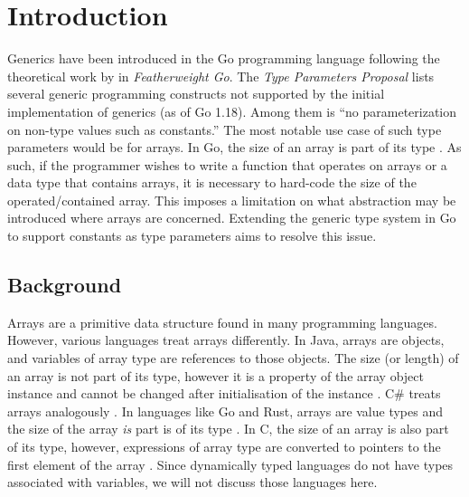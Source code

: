 \section{Introduction}

Generics have been introduced in the Go programming language following the
theoretical work by \cite{fg} in \emph{Featherweight Go}. The \emph{Type
    Parameters Proposal} lists several generic programming constructs not supported
by the initial implementation of generics (as of Go 1.18). Among them is ``no
parameterization on non-type values such as constants.''
\autocite{genericsProposal} The most notable use case of such type parameters
would be for arrays. In Go, the size of an array is part of its type
\autocite{spec}. As such, if the programmer wishes to write a function that
operates on arrays or a data type that contains arrays, it is necessary to
hard-code the size of the operated/contained array. This imposes a limitation on
what abstraction may be introduced where arrays are concerned. Extending the
generic type system in Go to support constants as type parameters aims to
resolve this issue.

\subsection{Background}

Arrays are a primitive data structure found in many programming languages.
However, various languages treat arrays differently. In Java, arrays are
objects, and variables of array type are references to those objects. The size
(or length) of an array is not part of its type, however it is a property of the
array object instance and cannot be changed after initialisation of the instance
\autocite{javaSpec}. C\# treats arrays analogously \autocite{cSharpArrays}. In
languages like Go and Rust, arrays are value types and the size of the array
\emph{is} part is of its type \autocites{spec}{rustSpec}. In C, the size of an
array is also part of its type, however, expressions of array type are converted
to pointers to the first element of the array \autocite{cSpec}. Since
dynamically typed languages do not have types associated with variables, we will
not discuss those languages here.


